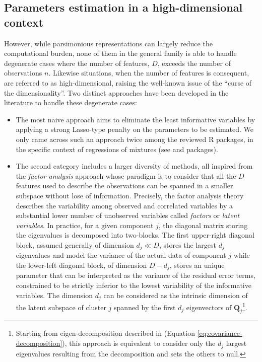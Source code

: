 \hypertarget{parameters-estimation-in-a-high-dimensional-context}{%
\subsection{Parameters estimation in a high-dimensional context}\label{parameters-estimation-in-a-high-dimensional-context}}

\label{subsec:high-dimensional}

However, while parsimonious representations can largely reduce the computational burden, none of them in the general family is able to handle degenerate cases where the number of features, \(D\), exceeds the number of observations \(n\). Likewise situations, when the number of features is consequent, are referred to as high-dimensional, raising the well-known issue of the ``curse of the dimensionality''. Two distinct approaches have been developed in the literature to handle these degenerate cases:

\begin{itemize}
\item
  The most naive approach aims to eliminate the least informative variables by applying a strong Lasso-type penalty on the parameters to be estimated. We only came across such an approach twice among the reviewed R packages, in the specific context of regressions of mixtures (see and  packages).
\item
  The second category includes a larger diversity of methods, all inspired from the \emph{factor analysis} approach whose paradigm is to consider that all the \(D\) features used to describe the observations can be spanned in a smaller subspace without lose of information. Precisely, the factor analysis theory describes the variability among observed and correlated variables by a substantial lower number of unobserved variables called \emph{factors} or \emph{latent variables}.
  In practice, for a given component \(j\), the diagonal matrix storing the eigenvalues is decomposed into two-blocks. The first upper-right diagonal block, assumed generally of dimension \(d_j \ll D\), stores the largest \(d_j\) eigenvalues and model the variance of the actual data of component \(j\) while the lower-left diagonal block, of dimension \(D-d_j\), stores an unique parameter that can be interpreted as the variance of the residual error terms, constrained to be strictly inferior to the lowest variability of the informative variables. The dimension \(d_j\) can be considered as the intrinsic dimension of the latent subspace of cluster \(j\) spanned by the first \(d_j\) eigenvectors of \(\boldsymbol{Q}_j\)\footnote{Starting from eigen-decomposition described in (Equation \eqref{eq:covariance-decomposition}), this approach is equivalent to consider only the \(d_j\) largest eigenvalues resulting from the decomposition and sets the others to null.}.
\end{itemize}


